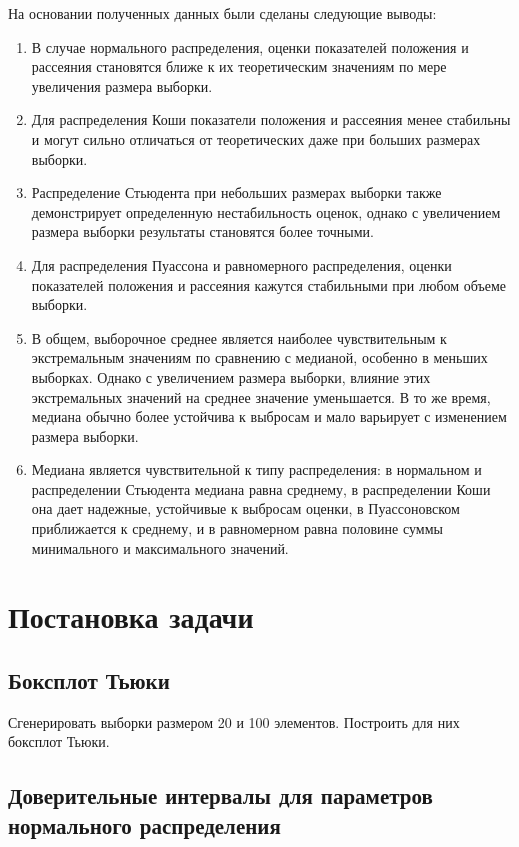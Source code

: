 \documentclass[12pt,a4paper]{article}
\begin{document}
	На основании полученных данных были сделаны следующие выводы:

	\begin{enumerate}
		\item В случае нормального распределения, оценки показателей положения и рассеяния становятся ближе к их теоретическим значениям по мере увеличения размера выборки.
		\item Для распределения Коши показатели положения и рассеяния менее стабильны и могут сильно отличаться от теоретических даже при больших размерах выборки.
		\item Распределение Стьюдента при небольших размерах выборки также демонстрирует определенную нестабильность оценок, однако с увеличением размера выборки результаты становятся более точными.
		\item Для распределения Пуассона и равномерного распределения, оценки показателей положения и рассеяния кажутся стабильными при любом объеме выборки.
		\item В общем, выборочное среднее является наиболее чувствительным к экстремальным значениям по сравнению с медианой, особенно в меньших выборках. Однако с увеличением размера выборки, влияние этих экстремальных значений на среднее значение уменьшается. В то же время, медиана обычно более устойчива к выбросам и мало варьирует с изменением размера выборки.
		\item Медиана является чувствительной к типу распределения: в нормальном и распределении Стьюдента медиана равна среднему, в распределении Коши она дает надежные, устойчивые к выбросам оценки, в Пуассоновском приближается к среднему, и в равномерном равна половине суммы минимального и максимального значений.
	\end{enumerate}

	\section{Постановка задачи}

	\subsection{Боксплот Тьюки}

	Сгенерировать выборки размером 20 и 100 элементов. Построить для них боксплот Тьюки.

	\subsection{Доверительные интервалы для параметров нормального распределения}
\end{document}
